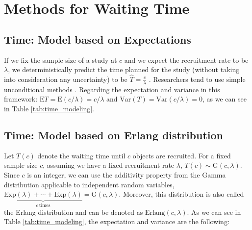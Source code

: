 \chapter{Methods for Waiting Time} 
\section{Time: Model based on Expectations}

If we fix the sample size of a study at $c$ and we expect the recruitment rate to be $\lambda$, we deterministically predict the time planned for the study (without taking into consideration any uncertainty) to be $\hat{T}=\frac{c}{\lambda}$ \citep{bagiella2001predicting}. Researchers tend to use simple unconditional methods \citep{white2015projection}. Regarding the expectation and variance in this framework: $\textrm{E}T = \textrm{E}(c/\lambda) = c/\lambda$ and $\textrm{Var}(T) = \textrm{Var}(c/\lambda) = 0$, as we can see in Table \ref{tab:time_modeling}.


\begin{table}[h!]
\centering
{}
\caption{Moments and aleatory and epistemic uncertainty of recruitment covered by different models for time having a fixed sample size $c$.}
\label{tab:time_modeling}
\end{table}

\section{Time: Model based on Erlang distribution}
Let $T(c)$ denote the waiting time until $c$ objects are recruited. For a fixed sample size $c$, assuming we have a fixed recruitment rate $\lambda$, $T(c)\sim\textrm{G}(c, \lambda)$. Since $c$ is an integer, we can use the additivity property from the Gamma distribution applicable to independent random variables, $\underbrace{\textrm{Exp} (\lambda) +\cdots +\textrm{Exp} (\lambda)}_{c \ \text{times}} = \textrm{G} (c, \lambda)$. Moreover, this distribution is also called the Erlang distribution and can be denoted as $\textrm{Erlang} (c, \lambda)$. As we can see in Table \ref{tab:time_modeling}, the expectation and variance are the following:

